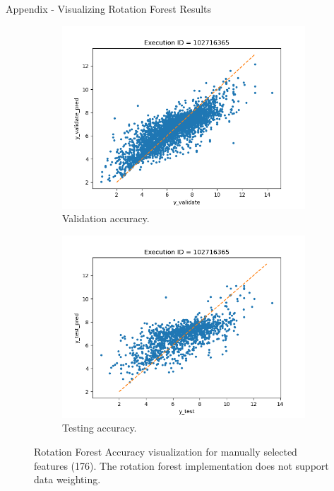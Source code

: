 \documentclass{beamer}
\begin{document}
\begin{frame}[t]{Appendix - Visualizing Rotation Forest Results}
\begin{figure}
     \centering
     \begin{subfigure}[b]{0.45\textwidth}
         \centering
         \includegraphics[scale=0.35]{images/accuracyRotationFRvalidate}
         \caption{Validation accuracy.}
        \label{fig:accuracyRotationFRvalidate}
     \end{subfigure}
     \hfill
     \begin{subfigure}[b]{0.45\textwidth}
         \centering
         \includegraphics[scale=0.35]{images/accuracyRotationFRtest}
        \caption{Testing accuracy.}
        \label{fig:accuracyRotationFRtest}
     \end{subfigure}
     \caption{Rotation Forest Accuracy visualization for manually selected features (176).  The rotation forest implementation does not support data weighting.}
     \label{fig:RotationForestAccuracy}
\end{figure}
\end{frame}
\end{document}
